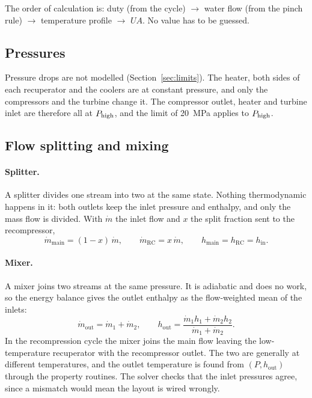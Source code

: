 The order of calculation is: duty (from the cycle) $\rightarrow$ water flow (from the pinch rule) $\rightarrow$ temperature profile $\rightarrow$ $UA$. No value has to be guessed.


\subsection{Pressures}
Pressure drops are not modelled (Section~\ref{sec:limits}). The heater, both sides of each recuperator and the coolers are at constant pressure, and only the compressors and the turbine change it. The compressor outlet, heater and turbine inlet are therefore all at $P_\mathrm{high}$, and the limit of \SI{20}{MPa} applies to $P_\mathrm{high}$.


\subsection{Flow splitting and mixing}
\paragraph{Splitter.} A splitter divides one stream into two at the same state. Nothing thermodynamic happens in it: both outlets keep the inlet pressure and enthalpy, and only the mass flow is divided. With $\dot m$ the inlet flow and $x$ the split fraction sent to the recompressor,
\begin{equation}
\dot m_\mathrm{main} = (1 - x)\,\dot m, \qquad \dot m_\mathrm{RC} = x\,\dot m, \qquad h_\mathrm{main} = h_\mathrm{RC} = h_\mathrm{in}.
\end{equation}

\paragraph{Mixer.} A mixer joins two streams at the same pressure. It is adiabatic and does no work, so the energy balance gives the outlet enthalpy as the flow-weighted mean of the inlets:
\begin{equation}
\dot m_\mathrm{out} = \dot m_1 + \dot m_2, \qquad h_\mathrm{out} = \frac{\dot m_1 h_1 + \dot m_2 h_2}{\dot m_1 + \dot m_2}.
\end{equation}
In the recompression cycle the mixer joins the main flow leaving the low-temperature recuperator with the recompressor outlet. The two are generally at different temperatures, and the outlet temperature is found from $(P, h_\mathrm{out})$ through the property routines. The solver checks that the inlet pressures agree, since a mismatch would mean the layout is wired wrongly.

